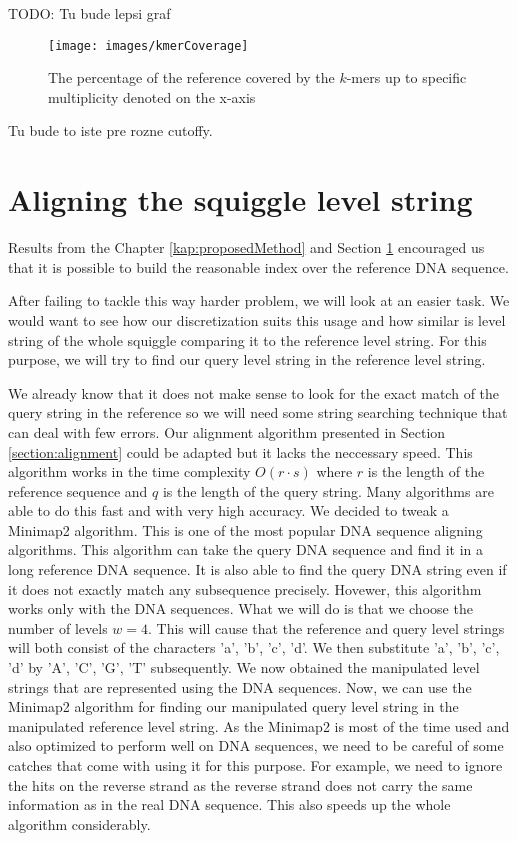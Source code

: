 TODO: Tu bude lepsi graf

\begin{figure}
\centerline{\texttt{[image: images/kmerCoverage]}}
\caption[TODO]{The percentage of the reference covered by the $k$-mers up to specific multiplicity
denoted on the x-axis}
\label{obr:kmerCoverage}
\end{figure}


Tu bude to iste pre rozne cutoffy.

\section{Aligning the squiggle level string}
\label{section:alignMinimap}

Results from the Chapter \ref{kap:proposedMethod} and Section \ref{section:alignMinimap}
encouraged us that it is possible to build the reasonable index over the reference
DNA sequence.

After failing to tackle this way harder problem, we will look at an easier task. We would want to see how
our discretization suits this usage and how similar is level string of the whole squiggle
comparing it to the reference level string. For this purpose, we will try to
find our query level string in the reference level string.

We already know that it does not make sense to look for the exact match of the query string in the reference
so we will need some string searching technique that can deal with few errors.
Our alignment algorithm presented in Section \ref{section:alignment} could be adapted but it lacks the neccessary speed. This
algorithm works in the time complexity $O(r\cdot s)$ where $r$ is the length of the
reference sequence and $q$ is the length of the query string. Many algorithms are able
to do this fast and with very high accuracy. We decided to tweak a Minimap2 \cite{li2018minimap2} algorithm. This is
one of the most popular DNA sequence aligning algorithms. This algorithm can take the
query DNA sequence and find it in a long reference DNA sequence. It is also able to
find the query DNA string even if it does not exactly match any subsequence precisely.
Hovewer, this algorithm works only with the DNA sequences. What we will do is that we choose
the number of levels $w=4$. This will cause that the reference and query level strings will both consist of
the characters 'a', 'b', 'c', 'd'. We then substitute 'a', 'b', 'c', 'd' by
'A', 'C', 'G', 'T' subsequently. We now obtained the manipulated level strings that
are represented using the DNA sequences. Now, we can use the Minimap2 algorithm for
finding our manipulated query level string in the manipulated reference level string.
As the Minimap2 is most of the time used and also optimized to perform well on DNA
sequences, we need to be careful of some catches that come with using it for this
purpose. For example, we need to ignore the hits on the reverse strand as the
reverse strand does not carry the same information as in the real DNA sequence.
This also speeds up the whole algorithm considerably.

